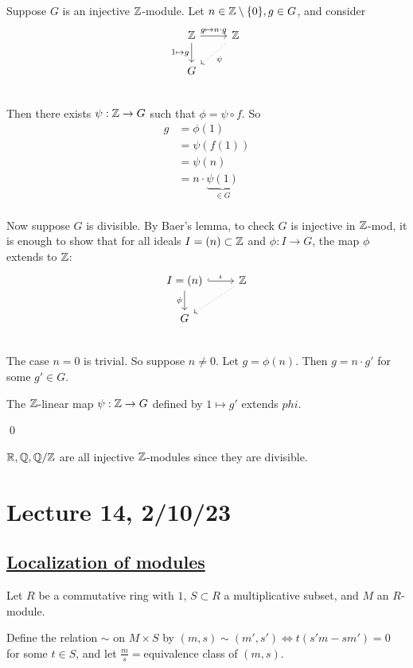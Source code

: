 \documentclass[x11names,reqno,14pt]{extarticle}
\begin{document}
\proof

Suppose $G$ is an injective $\mathbb{Z}$-module. Let $n\in\mathbb{Z}\setminus\{0\}, g \in G$, and consider 
\[
\begin{tikzcd}
\Z\ar[d, "1\mapsto g"'] \ar[r, "g\mapsto n\cdot g "]& \Z \ar[dl, dotted, "\psi"]\\
G & \\
\end{tikzcd}
\]
Then there exists $\psi:\mathbb{Z}\to G$ such that $\phi = \psi \circ f$. So
\begin{align*}
g & = \phi(1) \\ & = \psi(f(1)) \\ & = \psi(n) \\ & = n\cdot\underbrace{\psi(1)}_{\in G} \\
\end{align*}

Now suppose $G$ is divisible. By Baer's lemma, to check $G$ is injective in $\mathbb{Z}$-mod, it is enough to show that for all ideals $I = (n)\subset\mathbb{Z}$ and $\phi:I\to G$, the map $\phi$ extends to $\mathbb{Z}$:
\[
\begin{tikzcd}
I = (n)\ar[r, hook, "\iota"] \ar[d, "\phi"']& \Z \ar[dl, dotted]\\
G & \\
\end{tikzcd}
\]
The case $n = 0$ is trivial. So suppose $n  \neq0$. Let $g=\phi(n)$. Then $g = n\cdot g'$ for some $g' \in G$. 

The $\mathbb{Z}$-linear map $\psi:\mathbb{Z}\to G$ defined by $1\mapsto g'$ extends $phi$. 

\qed

\exm

$\mathbb{R}, \mathbb{Q}, \mathbb{Q}/\mathbb{Z}$ are all injective $\mathbb{Z}$-modules since they are divisible. 

\section*{Lecture 14, 2/10/23}

\subsection*{\underline{Localization of modules}}

Let $R$ be a commutative ring with $1$, $S \subset R$ a multiplicative subset, and $M$ an $R$-module.

Define the relation $\sim$ on $M\times S$ by $(m, s) \sim (m', s') \iff t(s'm - sm') = 0$ for some $t\in S$, and let $\frac{m}{s} = $equivalence class of $(m, s)$. 
\end{document}
